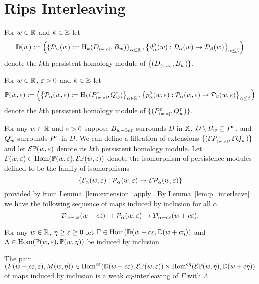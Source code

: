 
\section{Rips Interleaving}

For $w\in\mathbb{R}$ and $k\in\mathbb{Z}$ let
\[ \mathbb{D}(w) := \left(\left\{{\mathcal{D}}_\alpha(w) := \mathrm{H}_k(D_{\scriptscriptstyle (w,\alpha]},B_w)\right\}_{\alpha\in\mathbb{R}},\left\{d_\alpha^\beta(w) : {\mathcal{D}}_\alpha(w)\to{\mathcal{D}}_\beta(w)\right\}_{\alpha\leq\beta}\right)\]
denote the $k$th persistent homology module of $\{(D_{\scriptscriptstyle (w,\alpha]},B_w)\}$.

For $w\in\mathbb{R}$, $\varepsilon > 0$ and $k\in\mathbb{Z}$ let
\[\mathbb{P}(w,\varepsilon) := \left(\left\{\mathcal{P}_\alpha(w,\varepsilon) := \mathrm{H}_k(P_{\scriptscriptstyle (w,\alpha]}^\varepsilon,Q_w^\varepsilon)\right\}_{\alpha\in\mathbb{R}}, \left\{p_\alpha^\beta(w,\varepsilon) : \mathcal{P}_\alpha(w,\varepsilon)\to\mathcal{P}_\beta(w,\varepsilon)\right\}_{\alpha\leq\beta}\right)\]
denote the $k$th persistent homology module of $\{(P_{\scriptscriptstyle (w,\alpha]}^\varepsilon,Q_w^\varepsilon)\}$.

For any $w\in\mathbb{R}$ and $\varepsilon > 0$ suppose $B_{w-3c\varepsilon}$ surrounds $D$ in $\mathbb{X}$, $D\setminus B_w \subseteq P^\varepsilon$, and $Q_w^\varepsilon$ surrounds $P^\varepsilon$ in $D$.
We can define a filtration of extensions $\{(\mathcal{E} P_{\scriptscriptstyle (w,\alpha]}^\varepsilon,\mathcal{E} Q_w^\varepsilon)\}$ and let $\mathcal{E} \mathbb{P}(w,\varepsilon)$ denote its $k$th persistent homology module.
Let
$\mathcal{E}(w,\varepsilon) \in \mathrm{Hom}(\mathbb{P}(w,\varepsilon),\mathcal{E} \mathbb{P}(w,\varepsilon))$
denote the isomorphism of persistence modules defined to be the family of isomorphisms
\[ \{\mathcal{E}_\alpha(w,\varepsilon) : \mathcal{P}_\alpha(w,\varepsilon)\to \mathcal{E} \mathcal{P}_\alpha(w,\varepsilon)\}\]
provided by from Lemma~\ref{lem:extension_apply}.
By Lemma~\ref{lem:p_interleave} we have the following sequence of maps induced by inclusion for all $\alpha$
\[ {\mathcal{D}}_{\alpha-c\varepsilon}(w-c\varepsilon)\to \mathcal{P}_{\alpha}(w,\varepsilon)\to {\mathcal{D}}_{\alpha+c\varepsilon}(w+c\varepsilon).\]

%

\begin{lemma}\label{lem:weak_interleave_left}
  For any $w\in\mathbb{R}$, $\eta\geq\varepsilon \geq 0$ let $\Gamma\in\mathrm{Hom}(\mathbb{D}(w-c\varepsilon, \mathbb{D}(w+c\eta))$ and $\Lambda\in\mathrm{Hom}(\mathbb{P}(w,\varepsilon),\mathbb{P}(w,\eta))$ be induced by inclusion.

  The pair $(F(w-c\varepsilon,\varepsilon), M(w,\eta))\in \mathrm{Hom}^{c\varepsilon}(\mathbb{D}(w-c\varepsilon), \mathcal{E} \mathbb{P}(w,\varepsilon))\times\mathrm{Hom}^{c\eta}(\mathcal{E} \mathbb{P}(w,\eta),\mathbb{D}(w+c\eta))$ of maps induced by inclusion is a weak $c\eta$-interleaving of $\Gamma$ with $\Lambda$.
\end{lemma}

